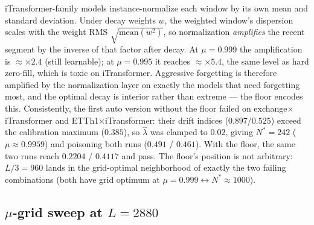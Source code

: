 iTransformer-family models instance-normalize each window by its own mean and standard deviation. Under decay weights $w$, the weighted window's dispersion scales with the weight RMS $\sqrt{\mathrm{mean}(w^2)}$, so normalization \emph{amplifies} the recent segment by the inverse of that factor after decay. At $\mu = 0.999$ the amplification is $\approx {\times}2.4$ (still learnable); at $\mu = 0.995$ it reaches $\approx {\times}5.4$, the same level as hard zero-fill, which is toxic on iTransformer. Aggressive forgetting is therefore amplified by the normalization layer on exactly the models that need forgetting most, and the optimal decay is interior rather than extreme --- the floor encodes this. Consistently, the first auto version without the floor failed on exchange$\times$iTransformer and ETTh1$\times$iTransformer: their drift indices ($0.897$/$0.525$) exceed the calibration maximum ($0.385$), so $\hat{\lambda}$ was clamped to $0.02$, giving $N^* = 242$ ($\mu \approx 0.9959$) and poisoning both runs ($0.491$ / $0.461$). With the floor, the same two runs reach $0.2204$ / $0.4117$ and pass. The floor's position is not arbitrary: $L/3 = 960$ lands in the grid-optimal neighborhood of exactly the two failing combinations (both have grid optimum at $\mu = 0.999 \leftrightarrow N^* \approx 1000$).

\subsection{\texorpdfstring{$\mu$}{mu}-grid sweep at $L{=}2880$}

